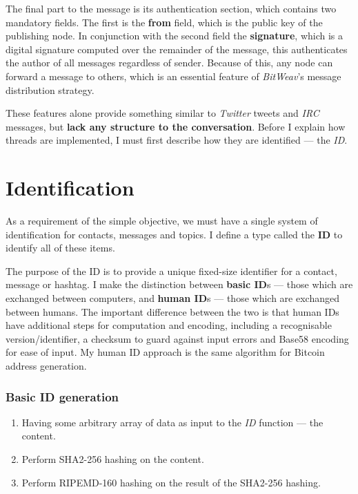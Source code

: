 \documentclass[10pt,a4paper,onecolumn]{article}
\begin{document}
The final part to the message is its authentication section, which contains two mandatory fields. The first is the \textbf{from} field, which is the public key of the publishing node. In conjunction with the second field the \textbf{signature}, which is a digital signature computed over the remainder of the message, this authenticates the author of all messages regardless of sender. Because of this, any node can forward a message to others, which is an essential feature of \textit{BitWeav}'s message distribution strategy.

These features alone provide something similar to \textit{Twitter} tweets and \textit{IRC} messages, but \textbf{lack any structure to the conversation}. Before I explain how threads are implemented, I must first describe how they are identified — the \emph{ID}.

\section{Identification}
\label{id}
As a requirement of the simple objective, we must have a single system of identification for contacts, messages and topics. I define a type called the \textbf{ID} to identify all of these items. 

The purpose of the ID is to provide a unique fixed-size identifier for a contact, message or hashtag. I make the distinction between \textbf{basic ID}s — those which are exchanged between computers, and \textbf{human ID}s — those which are exchanged between humans. The important difference between the two is that human IDs have additional steps for computation and encoding, including a recognisable version/identifier, a checksum to guard against input errors and Base58 encoding for ease of input. My human ID approach is the same algorithm for Bitcoin address generation\cite{btcAddr}. 

\subsubsection*{Basic ID generation}
\begin{enumerate}
\item Having some arbitrary array of data as input to the \emph{ID} function — the content.
\item Perform SHA2-256 hashing on the content.
\item Perform RIPEMD-160 hashing on the result of the SHA2-256 hashing.
\end{enumerate}
\end{document}
